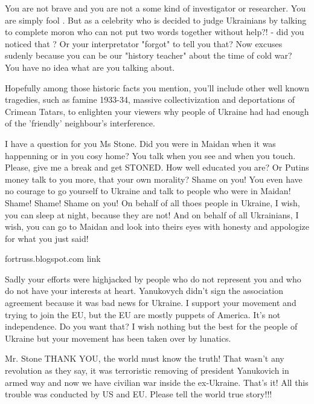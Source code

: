 \begin{itemize}

You are not brave and you are not a some kind of investigator or researcher.
You are simply fool . But as a celebrity who is decided to judge Ukrainians by
talking to complete moron who can not put two words together without help?! -
did you noticed that ? Or your interpretator "forgot" to tell you that? Now
excuses sudenly because you can be our "history teacher" about the time of cold
war? You have no idea what are you talking about.



Hopefully among those historic facts you mention, you'll include other well
known tragedies, such as famine 1933-34, massive collectivization and
deportations of Crimean Tatars, to enlighten your viewers why people of Ukraine
had had enough of the 'friendly' neighbour's interference.


I have a question for you Ms Stone. Did you were in Maidan when it was
happenning or in you cosy home? You talk when you see and when you touch.
Please, give me a break and get STONED. How well educated you are? Or Putins
money talk to you more, that your own morality? Shame on you! You even have no
courage to go yourself to Ukraine and talk to people who were in Maidan! Shame!
Shame! Shame on you! On behalf of all thoes people in Ukraine, I wish, you can
sleep at night, because they are not! And on behalf of all Ukrainians, I wish,
you can go to Maidan and look into theirs eyes with honesty and appologize for
what you just said!

\begin{itemize} %

fortruss.blogspot.com link

Sadly your efforts were highjacked by people who do not represent you and who
do not have your interests at heart. Yanukovych didn't sign the association
agreement because it was bad news for Ukraine. I support your movement and
trying to join the EU, but the EU are mostly puppets of America. It's not
independence. Do you want that? I wish nothing but the best for the people of
Ukraine but your movement has been taken over by lunatics.

\end{itemize} %


Mr. Stone THANK YOU, the world must know the truth! That wasn't any revolution
as they say, it was terroristic removing of president Yanukovich in armed way
and now we have civilian war inside the ex-Ukraine. That's it! All this trouble
was conducted by US and EU. Please tell the world true story!!!



\end{itemize}
